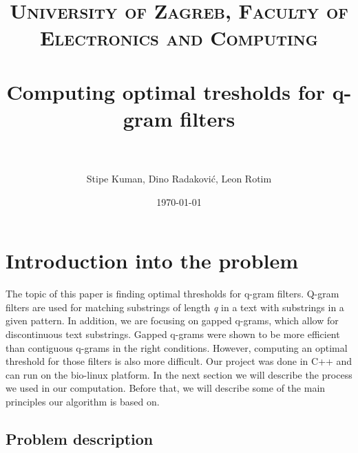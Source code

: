 \documentclass[paper=a4, fontsize=11pt]{scrartcl} %
\title{	
\normalfont \normalsize 
\textsc{University of Zagreb, Faculty of Electronics and Computing} \\ [25pt] %
\horrule{0.5pt} \\[0.4cm] %
\huge Computing optimal tresholds for q-gram filters \\ %
\horrule{2pt} \\[0.5cm] %
}
\author{Stipe Kuman, Dino Radaković, Leon Rotim} %
\date{\normalsize\today} %
\numberwithin{equation}{section} %
\numberwithin{figure}{section} %
\numberwithin{table}{section} %
\begin{document}
\maketitle %



\section{Introduction into the problem}

The topic of this paper is finding optimal thresholds for q-gram filters. Q-gram filters
are used for matching substrings of length \textit{q} in a text with substrings in a given pattern. In addition, we are focusing on
gapped q-grams, which allow for discontinuous text substrings. Gapped q-grams were shown to be more efficient than 
contiguous q-grams in the right conditions. However, computing an optimal threshold for those filters is also more difficult. 
Our project was done in C++ and can run on the bio-linux platform.
In the next section we will describe the process we used in our computation. Before that, we will describe some of the main
principles our algorithm is based on.  %



\subsection{Problem description}
\end{document}
